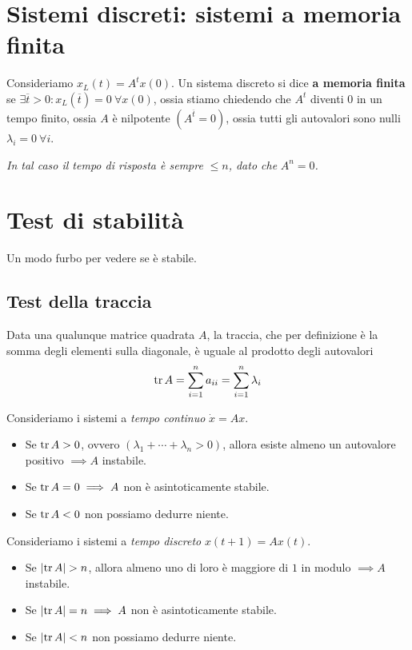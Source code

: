 \section{Sistemi discreti: sistemi a memoria finita}

Consideriamo $x_L\left(t\right) =A^t x\left(0\right)$. Un sistema discreto si dice \textbf{a memoria finita} se $\exists \overline{t}  >0:x_L\left(\overline{t}\right) =0\ \forall x\left(0\right)$, ossia stiamo chiedendo che $A^t$ diventi $0$ in un tempo finito, ossia $A$ è nilpotente $\left(A^{\overline{t}} =0\right)$, ossia tutti gli autovalori sono nulli $\lambda _i =0\ \forall i$.

\textit{In tal caso il tempo di risposta è sempre }$\leq n$\textit{, dato che }$A^n =0$\textit{.}

\section{Test di stabilità}

Un modo furbo per vedere se è stabile.

\subsection{Test della traccia}

\begin{rem}
	Data una qualunque matrice quadrata $A$, la traccia, che per definizione è la somma degli elementi sulla diagonale, è uguale al prodotto degli autovalori
	\begin{equation*}
		\operatorname{tr} A=\sum\limits ^n_{i=1} a_{ii} =\sum\limits ^n_{i=1} \lambda _i
	\end{equation*}
\end{rem}

Consideriamo i sistemi a \textit{tempo continuo} $\dot{x} =Ax$.
\begin{itemize}
	\item Se $\operatorname{tr} A >0$, ovvero $\left(\lambda _1 +\cdots +\lambda _n  >0\right)$, allora esiste almeno un autovalore positivo $\implies A$ instabile.
	\item Se $\operatorname{tr} A=0\implies A$ non è asintoticamente stabile.
	\item Se $\operatorname{tr} A< 0$ non possiamo dedurre niente.
\end{itemize}

Consideriamo i sistemi a \textit{tempo discreto} $x\left(t+1\right) =Ax\left(t\right)$.
\begin{itemize}
	\item Se $\left| \operatorname{tr} A\right|  >n$, allora almeno uno di loro è maggiore di $1$ in modulo $\implies A$ instabile.
	\item Se $\left| \operatorname{tr} A\right| =n\implies A$ non è asintoticamente stabile.
	\item Se $\left| \operatorname{tr} A\right| < n$ non possiamo dedurre niente.
\end{itemize}

